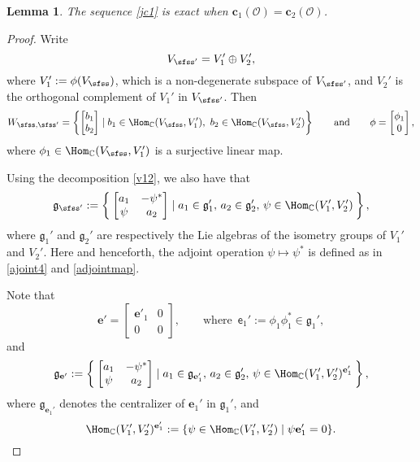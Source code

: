 \documentclass[12pt,a4paper]{amsart}
\newcommand{\CO}{{\mathcal {O}}}
\newcommand{\g}{\mathfrak g}
\newcommand{\be}{\begin {equation}}
\newcommand{\ee}{\end {equation}}
\numberwithin{equation}{section}
\newtheorem{lem}[thm]{Lemma}
\theoremstyle{remark}
\begin{document}
\begin{lem}\label{lemexact2}
The sequence \eqref{jc1} is exact when $\mathbf c_1(\CO)=\mathbf c_2(\CO)$.
\end{lem}
\begin{proof}
Write 
\be\label{v12}
V_{\sfss'}=V_1'\oplus V_2',
\ee
where $V_1':=\phi(V_{\sfss})$, which is a non-degenerate subspace of $V_{\sfss'}$, and $V_2'$ is the orthogonal complement of $V_1'$ in $V_{\sfss'}$. Then
\[
   W_{\sfss, \sfss'}=\left\{\begin{bmatrix}
        b_1\\
        b_2
      \end{bmatrix} \mid b_1\in  \Hom_\C(V_\sfss, V_1'), \ b_2\in  \Hom_\C(V_\sfss, V_2')\right\} \qquad\textrm{and}\qquad \phi=\begin{bmatrix}
        \phi_1\\
        0
      \end{bmatrix},
\]
where $\phi_1\in \Hom_\C(V_\sfss, V_1')$ is a surjective linear map. 

Using the decomposition \eqref{v12}, we also have that 
\[
 \g_{\sfss'}:= \Set{\begin{bmatrix}
        a_1 & -\psi^*\\
        \psi & a_2
      \end{bmatrix}\mid a_1\in \g_1', \, a_2\in \g_2', \,\psi \in \Hom_\C(V_1', V_2')},
\]
where $\g_1'$ and $\g_2'$ are respectively the Lie algebras of the isometry groups of $V_1'$ and $V_2'$. Here and henceforth, the adjoint operation $\psi\mapsto \psi^*$ is defined as in 
\eqref{ajoint4} and \eqref{adjointmap}. 

Note that 
\[
  \mathbf e'=\begin{bmatrix}
        \mathbf e'_1 & 0\\
        0 & 0
      \end{bmatrix}, \qquad \textrm{where  } \, \mathsf e_1':=\phi_1 \phi_1^*\in \g_1',%
\]
and 
\[
 \g_{\mathbf e'}:= \Set{\begin{bmatrix}
        a_1 & -\psi^*\\
        \psi & a_2
      \end{bmatrix}\mid a_1\in \g_{\mathbf e_1'}, \, a_2\in \g_2', \,\psi \in \Hom_\C(V_1', V_2')^{\mathbf e_1'}},
\]
where $\g_{\mathbf e_1'}$ denotes the centralizer of $\mathbf e_1'$ in $\g_1'$, and 
\[
   \Hom_\C(V_1', V_2')^{\mathbf e_1'}:=\{\psi\in  \Hom_\C(V_1', V_2')\mid \psi  {\mathbf e_1'}=0\}.
\]



\end{proof}
\end{document}
